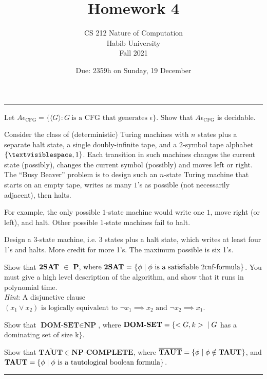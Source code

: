 \documentclass[a4page]{exam}
\title{Homework 4}
\author{CS 212 Nature of Computation\\Habib University\\Fall 2021}
\date{Due: 2359h on Sunday, 19 December}
\begin{document}
\maketitle
\thispagestyle{empty}

\noindent\rule{\textwidth}{1pt}

\begin{questions}
\question[20] Let $A\epsilon_\text{CFG} = \{ \langle G \rangle : G\ \text{is a CFG that generates $\epsilon$}\}$. Show that $A\epsilon_\text{CFG}$ is decidable.

\question[20] Consider the class of (deterministic) Turing machines with $n$ states plus a separate halt state, a single doubly-infinite tape, and a $2$-symbol tape alphabet $\{\textvisiblespace, 1 \}$. Each transition in such machines changes the current state (possibly), changes the current symbol (possibly) and moves \textsf{left} or \textsf{right}. The ``Busy Beaver'' problem is to design such an $n$-state Turing machine that starts on an empty tape, writes as many $1$'s as possible (not necessarily adjacent), then halts.

  For example, the only possible $1$-state machine would write one $1$, move \textsf{right} (or \textsf{left}), and halt. Other possible $1$-state machines fail to halt.

  Design a 3-state machine, i.e. 3 states plus a halt state, which writes at least four 1’s and halts. More credit for more 1’s. The maximum possible is six 1’s.
  
\question[20] Show that $\textbf{2SAT } \in  \textbf{ P}\text{, where }\textbf{2SAT}\text{ = } \{ \phi \hspace{1mm} | \hspace{1mm} \phi \text{ is a satisfiable 2cnf-formula}\}$. You must give a high level description of the algorithm, and show that it runs in polynomial time. \\ \textit{Hint}: A disjunctive clause $(x_1 \vee x_2) \text{ is logically equivalent to } \neg x_1 \implies x_2 \text{ and } \neg x_2 \implies x_1$.
  
\question[20] Show that $\textbf{DOM-SET} \in \textbf{NP}$, where $\textbf{DOM-SET} = \{ <G,k> \hspace{1mm} | \hspace{1mm}  G$  has a dominating set of size k$\}$.
  
\question[20] Show that $\overline{\textbf{TAUT}} \in \textbf{NP-COMPLETE}$, where $\overline{\textbf{TAUT}}=\{\phi \hspace{1mm} | \hspace{1mm} \phi \notin \textbf{TAUT} \}$, and $\textbf{TAUT} = \{ \phi \hspace{1mm} | \hspace{1mm} \phi \text{ is a tautological boolean formula} \}$.

\end{questions}

\noindent\rule{\textwidth}{1pt}
\end{document}
